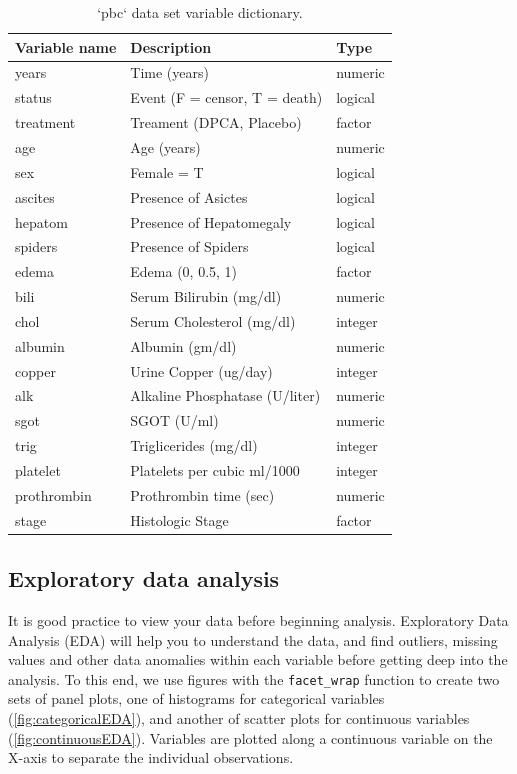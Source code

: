 \documentclass[article, nojss]{jss}
\begin{document}
\begin{Schunk}
\begin{table}

\caption{\label{tab:dta-table}`pbc` data set variable dictionary.\label{T:dataLabs}}
\centering
\begin{tabular}[t]{l|l|l}
\hline
Variable name & Description & Type\\
\hline
years & Time (years) & numeric\\
\hline
status & Event (F = censor, T = death) & logical\\
\hline
treatment & Treament (DPCA, Placebo) & factor\\
\hline
age & Age (years) & numeric\\
\hline
sex & Female = T & logical\\
\hline
ascites & Presence of Asictes & logical\\
\hline
hepatom & Presence of Hepatomegaly & logical\\
\hline
spiders & Presence of Spiders & logical\\
\hline
edema & Edema (0, 0.5, 1) & factor\\
\hline
bili & Serum Bilirubin (mg/dl) & numeric\\
\hline
chol & Serum Cholesterol (mg/dl) & integer\\
\hline
albumin & Albumin (gm/dl) & numeric\\
\hline
copper & Urine Copper (ug/day) & integer\\
\hline
alk & Alkaline Phosphatase (U/liter) & numeric\\
\hline
sgot & SGOT (U/ml) & numeric\\
\hline
trig & Triglicerides (mg/dl) & integer\\
\hline
platelet & Platelets per cubic ml/1000 & integer\\
\hline
prothrombin & Prothrombin time (sec) & numeric\\
\hline
stage & Histologic Stage & factor\\
\hline
\end{tabular}
\end{table}

\end{Schunk}

\subsection{Exploratory data analysis}\label{exploratory-data-analysis}

It is good practice to view your data before beginning analysis.
Exploratory Data Analysis (EDA) \citep{Tukey:1977} will help you to
understand the data, and find outliers, missing values and other data
anomalies within each variable before getting deep into the analysis. To
this end, we use  figures with the \texttt{facet\_wrap}
function to create two sets of panel plots, one of histograms for
categorical variables (\autoref{fig:categoricalEDA}), and another of
scatter plots for continuous variables (\autoref{fig:continuousEDA}).
Variables are plotted along a continuous variable on the X-axis to
separate the individual observations.
\end{document}

